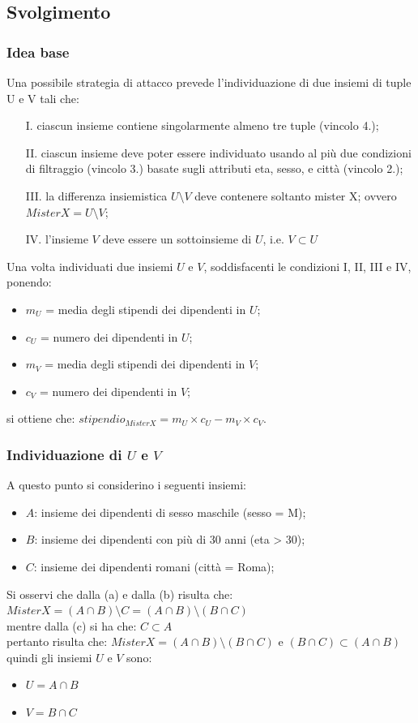\subsection{Svolgimento}
\subsubsection{Idea base}
Una possibile strategia di attacco prevede l'individuazione di due insiemi di tuple U e V tali che:
\begin{enumerate}
\item [I.] ciascun insieme contiene singolarmente almeno tre tuple (vincolo 4.);
\item [II.] ciascun insieme deve poter essere individuato usando al più due condizioni di filtraggio (vincolo 3.) basate sugli attributi eta, sesso, e città (vincolo 2.);
\item [III.] la differenza insiemistica $U \setminus V$ deve contenere soltanto mister X; ovvero ${Mister X} = U \setminus V$;
\item [IV.] l'insieme $V$ deve essere un sottoinsieme di $U$, i.e. $V \subset U$
\end{enumerate}
Una volta individuati due insiemi $U$ e $V$, soddisfacenti le condizioni I, II, III e IV, ponendo:
\begin{itemize}
\item $m_{U}$ = media degli stipendi dei dipendenti in $U$;
\item $c_{U}$ = numero dei dipendenti in $U$;
\item $m_{V}$ = media degli stipendi dei dipendenti in $V$;
\item $c_{V}$ = numero dei dipendenti in $V$;
\end{itemize}
si ottiene che: $stipendio_{Mister X} = m_{U} \times c_{U} - m_{V} \times c_{V}$.\\
\subsubsection{Individuazione di $U$ e $V$}
A questo punto si considerino i seguenti insiemi:
\begin{itemize}
\item $A$: insieme dei dipendenti di sesso maschile (sesso = M);
\item $B$: insieme dei dipendenti con più di 30 anni (eta > 30);
\item $C$: insieme dei dipendenti romani (città = Roma);
\end{itemize}
Si osservi che dalla (a) e dalla (b) risulta che: ${Mister X} = (A \cap B) \setminus C = (A \cap B) \setminus (B \cap C)$\\
mentre dalla (c) si ha che: $C \subset A$\\
pertanto risulta che: ${Mister X} = (A \cap B) \setminus (B \cap C)$ e $(B \cap C) \subset (A \cap B)$\\
quindi gli insiemi $U$ e $V$ sono:
\begin{itemize}
\item $U = A \cap B$
\item $V = B \cap C$
\end{itemize}
